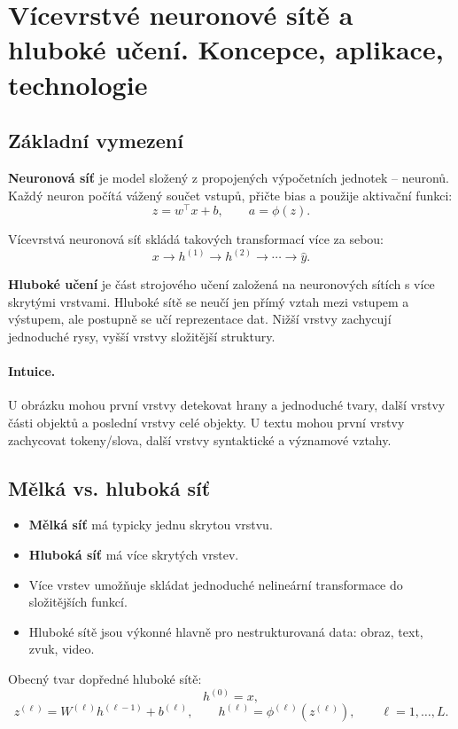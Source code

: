 \section{Vícevrstvé neuronové sítě a hluboké učení. Koncepce, aplikace, technologie}

\subsection{Základní vymezení}

\textbf{Neuronová síť} je model složený z propojených výpočetních jednotek -- neuronů. Každý neuron počítá
vážený součet vstupů, přičte bias a použije aktivační funkci:
\[
z = w^\top x + b,
\qquad
a = \phi(z).
\]

Vícevrstvá neuronová síť skládá takových transformací více za sebou:
\[
x
\rightarrow
h^{(1)}
\rightarrow
h^{(2)}
\rightarrow
\cdots
\rightarrow
\hat y.
\]

\textbf{Hluboké učení} je část strojového učení založená na neuronových sítích s více skrytými vrstvami.
Hluboké sítě se neučí jen přímý vztah mezi vstupem a výstupem, ale postupně se učí reprezentace dat.
Nižší vrstvy zachycují jednoduché rysy, vyšší vrstvy složitější struktury.

\paragraph{Intuice.}
U obrázku mohou první vrstvy detekovat hrany a jednoduché tvary, další vrstvy části objektů a poslední vrstvy
celé objekty. U textu mohou první vrstvy zachycovat tokeny/slova, další vrstvy syntaktické a významové vztahy.

\subsection{Mělká vs. hluboká síť}

\begin{itemize}
    \item \textbf{Mělká síť} má typicky jednu skrytou vrstvu.
    \item \textbf{Hluboká síť} má více skrytých vrstev.
    \item Více vrstev umožňuje skládat jednoduché nelineární transformace do složitějších funkcí.
    \item Hluboké sítě jsou výkonné hlavně pro nestrukturovaná data: obraz, text, zvuk, video.
\end{itemize}

Obecný tvar dopředné hluboké sítě:
\[
h^{(0)} = x,
\]
\[
z^{(\ell)} = W^{(\ell)}h^{(\ell-1)} + b^{(\ell)},
\qquad
h^{(\ell)} = \phi^{(\ell)}(z^{(\ell)}),
\qquad
\ell=1,\ldots,L.
\]

